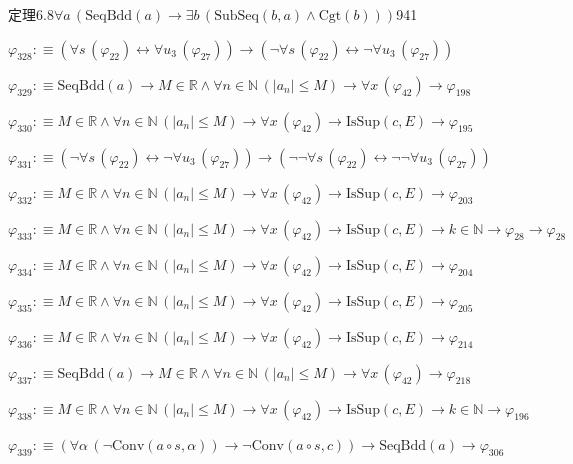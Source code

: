 \begin{fullproof}{定理6.8}{$\forall a\,(\mathrm{SeqBdd}(a) \to \exists b\,(\mathrm{SubSeq}(b,a) \land \mathrm{Cgt}(b)))$}{941}
\begin{abbrevlist}
\item $\varphi_{328} :\equiv (\forall s\,(\varphi_{22}) \leftrightarrow \forall u_{3}\,(\varphi_{27})) \to (\neg \forall s\,(\varphi_{22}) \leftrightarrow \neg \forall u_{3}\,(\varphi_{27}))$
\item $\varphi_{329} :\equiv \mathrm{SeqBdd}(a) \to M \in \mathbb{R} \land \forall n \in \mathbb{N}\,(\lvert a_{n} \rvert \leq M) \to \forall x\,(\varphi_{42}) \to \varphi_{198}$
\item $\varphi_{330} :\equiv M \in \mathbb{R} \land \forall n \in \mathbb{N}\,(\lvert a_{n} \rvert \leq M) \to \forall x\,(\varphi_{42}) \to \mathrm{IsSup}(c,E) \to \varphi_{195}$
\item $\varphi_{331} :\equiv (\neg \forall s\,(\varphi_{22}) \leftrightarrow \neg \forall u_{3}\,(\varphi_{27})) \to (\neg \neg \forall s\,(\varphi_{22}) \leftrightarrow \neg \neg \forall u_{3}\,(\varphi_{27}))$
\item $\varphi_{332} :\equiv M \in \mathbb{R} \land \forall n \in \mathbb{N}\,(\lvert a_{n} \rvert \leq M) \to \forall x\,(\varphi_{42}) \to \mathrm{IsSup}(c,E) \to \varphi_{203}$
\item $\varphi_{333} :\equiv M \in \mathbb{R} \land \forall n \in \mathbb{N}\,(\lvert a_{n} \rvert \leq M) \to \forall x\,(\varphi_{42}) \to \mathrm{IsSup}(c,E) \to k \in \mathbb{N} \to \varphi_{28} \to \varphi_{28}$
\item $\varphi_{334} :\equiv M \in \mathbb{R} \land \forall n \in \mathbb{N}\,(\lvert a_{n} \rvert \leq M) \to \forall x\,(\varphi_{42}) \to \mathrm{IsSup}(c,E) \to \varphi_{204}$
\item $\varphi_{335} :\equiv M \in \mathbb{R} \land \forall n \in \mathbb{N}\,(\lvert a_{n} \rvert \leq M) \to \forall x\,(\varphi_{42}) \to \mathrm{IsSup}(c,E) \to \varphi_{205}$
\item $\varphi_{336} :\equiv M \in \mathbb{R} \land \forall n \in \mathbb{N}\,(\lvert a_{n} \rvert \leq M) \to \forall x\,(\varphi_{42}) \to \mathrm{IsSup}(c,E) \to \varphi_{214}$
\item $\varphi_{337} :\equiv \mathrm{SeqBdd}(a) \to M \in \mathbb{R} \land \forall n \in \mathbb{N}\,(\lvert a_{n} \rvert \leq M) \to \forall x\,(\varphi_{42}) \to \varphi_{218}$
\item $\varphi_{338} :\equiv M \in \mathbb{R} \land \forall n \in \mathbb{N}\,(\lvert a_{n} \rvert \leq M) \to \forall x\,(\varphi_{42}) \to \mathrm{IsSup}(c,E) \to k \in \mathbb{N} \to \varphi_{196}$
\item $\varphi_{339} :\equiv (\forall \alpha\,(\neg \mathrm{Conv}(a \circ s,\alpha)) \to \neg \mathrm{Conv}(a \circ s,c)) \to \mathrm{SeqBdd}(a) \to \varphi_{306}$

\end{abbrevlist}
\end{fullproof}

